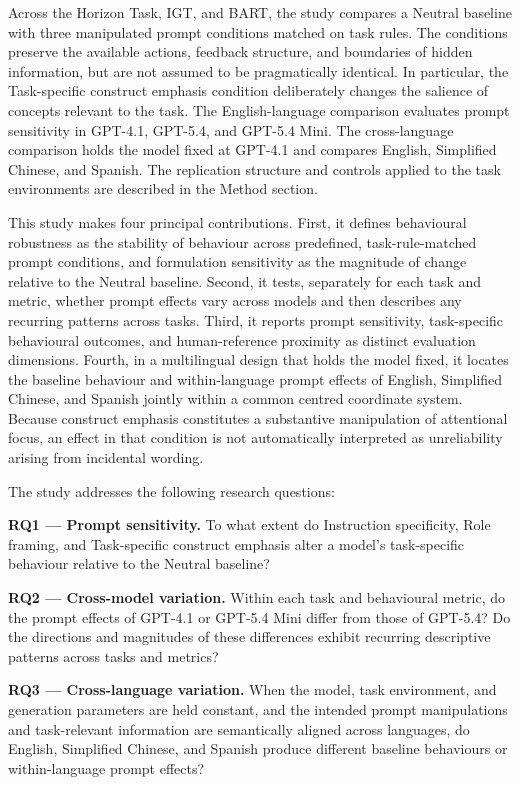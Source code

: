 \documentclass[logo,msc]{infthesis}
\begin{document}
Across the Horizon Task, IGT, and BART, the study compares a Neutral baseline with three manipulated prompt conditions matched on task rules. The conditions preserve the available actions, feedback structure, and boundaries of hidden information, but are not assumed to be pragmatically identical. In particular, the Task-specific construct emphasis condition deliberately changes the salience of concepts relevant to the task. The English-language comparison evaluates prompt sensitivity in GPT-4.1, GPT-5.4, and GPT-5.4 Mini. The cross-language comparison holds the model fixed at GPT-4.1 and compares English, Simplified Chinese, and Spanish. The replication structure and controls applied to the task environments are described in the Method section.

This study makes four principal contributions. First, it defines behavioural robustness as the stability of behaviour across predefined, task-rule-matched prompt conditions, and formulation sensitivity as the magnitude of change relative to the Neutral baseline. Second, it tests, separately for each task and metric, whether prompt effects vary across models and then describes any recurring patterns across tasks. Third, it reports prompt sensitivity, task-specific behavioural outcomes, and human-reference proximity as distinct evaluation dimensions. Fourth, in a multilingual design that holds the model fixed, it locates the baseline behaviour and within-language prompt effects of English, Simplified Chinese, and Spanish jointly within a common centred coordinate system. Because construct emphasis constitutes a substantive manipulation of attentional focus, an effect in that condition is not automatically interpreted as unreliability arising from incidental wording.

The study addresses the following research questions:

\noindent\textbf{RQ1 --- Prompt sensitivity.}
To what extent do Instruction specificity, Role framing, and Task-specific construct emphasis alter a model's task-specific behaviour relative to the Neutral baseline?

\noindent\textbf{RQ2 --- Cross-model variation.}
Within each task and behavioural metric, do the prompt effects of GPT-4.1 or GPT-5.4 Mini differ from those of GPT-5.4? Do the directions and magnitudes of these differences exhibit recurring descriptive patterns across tasks and metrics?

\noindent\textbf{RQ3 --- Cross-language variation.}
When the model, task environment, and generation parameters are held constant, and the intended prompt manipulations and task-relevant information are semantically aligned across languages, do English, Simplified Chinese, and Spanish produce different baseline behaviours or within-language prompt effects?
\end{document}
